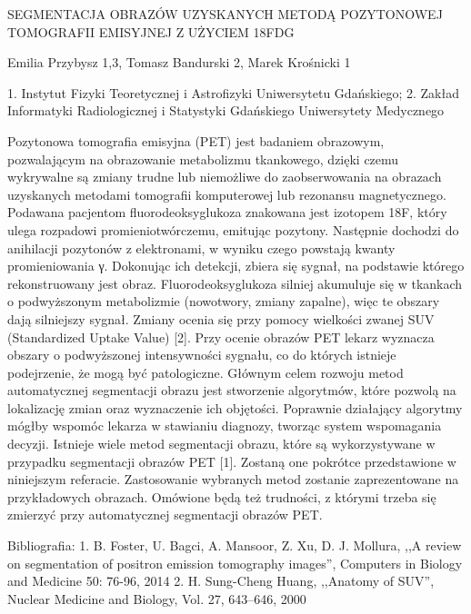 SEGMENTACJA OBRAZÓW UZYSKANYCH METODĄ POZYTONOWEJ TOMOGRAFII 
EMISYJNEJ Z UŻYCIEM 18FDG

Emilia Przybysz 1,3, Tomasz Bandurski 2, Marek Krośnicki 1

1. Instytut Fizyki Teoretycznej i Astrofizyki Uniwersytetu Gdańskiego;
2. Zakład Informatyki Radiologicznej i Statystyki Gdańskiego Uniwersytety Medycznego

Pozytonowa tomografia emisyjna (PET) jest badaniem obrazowym, pozwalającym na
obrazowanie metabolizmu tkankowego, dzięki czemu wykrywalne są zmiany trudne lub niemożliwe do  zaobserwowania na obrazach uzyskanych metodami tomografii komputerowej lub rezonansu magnetycznego. 
Podawana pacjentom fluorodeoksyglukoza znakowana jest izotopem 18F, który ulega rozpadowi promieniotwórczemu, emitując pozytony. Następnie dochodzi do anihilacji pozytonów z elektronami, w wyniku czego powstają kwanty promieniowania γ. Dokonując ich detekcji, zbiera się sygnał, na podstawie którego rekonstruowany jest obraz. Fluorodeoksyglukoza silniej akumuluje się w tkankach o podwyższonym metabolizmie (nowotwory, zmiany zapalne), więc te obszary dają silniejszy sygnał. Zmiany ocenia się przy pomocy wielkości zwanej SUV (Standardized Uptake Value) [2]. 
Przy ocenie obrazów PET lekarz wyznacza obszary o podwyższonej  intensywności sygnału, co do których istnieje podejrzenie, że mogą być patologiczne. Głównym celem rozwoju metod automatycznej segmentacji obrazu jest stworzenie algorytmów, które pozwolą na lokalizację zmian oraz wyznaczenie ich objętości. Poprawnie działający algorytmy mógłby wspomóc lekarza w stawianiu diagnozy, tworząc system wspomagania decyzji.
Istnieje wiele metod segmentacji obrazu, które są wykorzystywane w przypadku segmentacji 
obrazów PET [1]. Zostaną one pokrótce przedstawione w niniejszym referacie. Zastosowanie wybranych metod zostanie zaprezentowane na przykładowych obrazach. Omówione będą też trudności, z którymi trzeba się zmierzyć przy automatycznej segmentacji obrazów PET.

Bibliografia: 
1. B. Foster, U. Bagci, A. Mansoor, Z. Xu, D. J. Mollura, ,,A review on segmentation of positron emission tomography images”, Computers in Biology and Medicine 50: 76-96, 2014
2. H. Sung-Cheng Huang, ,,Anatomy of SUV”, Nuclear Medicine and Biology, Vol. 27, 643–646, 2000


